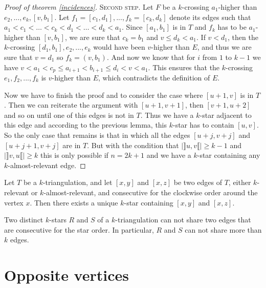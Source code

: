 \documentclass[12pt]{amsart}
\begin{document}
\begin{proof}[Proof of theorem \ref{incidences}]
\medskip
\noindent\textsc{Second step.}
Let $F$ be a $k$-crossing $a_1$-higher than $e_2,...,e_k,[v,b_1]$. Let $f_1=[c_1,d_1],...,f_k=[c_k,d_k]$ denote its edges such that $a_1<c_1<\ldots<c_k<d_1<\ldots<d_k<a_1$. Since $[a_1,b_1]$ is in $T$ and $f_k$ has to be $a_1$-higher than $[v,b_1]$, we are sure that $c_k=b_1$ and $v\le d_k<a_1$. If $v<d_1$, then the $k$-crossing $[d_1,b_1],e_2,...,e_k$ would have been $v$-higher than $E$, and thus we are sure that $v=d_1$ so $f_k=(v,b_1)$. And now we know that for $i$ from $1$ to $k-1$ we have $v<a_1<c_p\le a_{i+1}<b_{i+1}\le d_i<v<a_1$. This ensures that the $k$-crossing $e_1,f_2,...,f_k$ is $v$-higher than $E$, which contradicts the definition of $E$.

\bigskip
Now we have to finish the proof and to consider the case where $[u+1,v]$ is in $T$. Then we can reiterate the argument with $[u+1,v+1]$, then $[v+1,u+2]$ and so on until one of this edges is not in $T$. Thus we have a $k$-star adjacent to this edge and according to the previous lemma, this $k$-star has to contain $[u,v]$. So the only case that remains is that in which all the edges $[u+j,v+j]$ and $[u+j+1,v+j]$ are in $T$. But with the condition that $|\rrbracket u,v\llbracket|\ge k-1$ and $|\rrbracket v,u\llbracket|\ge k$ this is only possible if $n=2k+1$ and we have a $k$-star containing any $k$-almost-relevant edge.
\end{proof}

\begin{corollary}\label{angle}
Let $T$ be a $k$-triangulation, and let $[x,y]$ and $[x,z]$ be two edges of $T$, either $k$-relevant or $k$-almost-relevant, and consecutive for the clockwise order around the vertex $x$. Then there exists a unique $k$-star containing $[x,y]$ and $[x,z]$.
\end{corollary}

\begin{corollary}\label{commonedges}
Two distinct $k$-stars $R$ and $S$ of a $k$-triangulation can not share two edges that are consecutive for the star order. In particular, $R$ and $S$ can not share more than $k$ edges.
\end{corollary}


\section{Opposite vertices}
\end{document}
